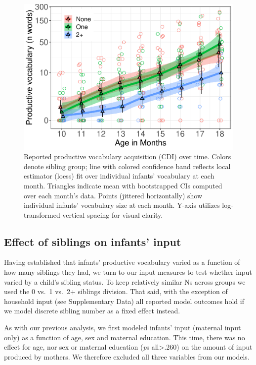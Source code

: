 \documentclass[
  man,floatsintext]{apa6}
\begin{document}
\begin{figure}
\centering
\includegraphics{SiblingsStudyText_files/figure-latex/Figure-SibGroup-1.pdf}
\caption{\label{fig:Figure-SibGroup}Reported productive vocabulary acquisition (CDI) over time. Colors denote sibling group; line with colored confidence band reflects local estimator (loess) fit over individual infants' vocabulary at each month. Triangles indicate mean with bootstrapped CIs computed over each month's data. Points (jittered horizontally) show individual infants' vocabulary size at each month. Y-axis utilizes log-transformed vertical spacing for visual clarity.}
\end{figure}

\hypertarget{effect-of-siblings-on-infants-input}{%
\subsection{Effect of siblings on infants' input}\label{effect-of-siblings-on-infants-input}}

Having established that infants' productive vocabulary varied as a function of how many siblings they had, we turn to our input measures to test whether input varied by a child's sibling status. To keep relatively similar Ns across groups we used the 0 vs.~1 vs.~2+ siblings division. That said, with the exception of household input (see Supplementary Data) all reported model outcomes hold if we model discrete sibling number as a fixed effect instead.

As with our previous analysis, we first modeled infants' input (maternal input only) as a function of age, sex and maternal education. This time, there was no effect for age, nor sex or maternal education (\emph{p}s all\textgreater.260) on the amount of input produced by mothers. We therefore excluded all three variables from our models.
\end{document}
